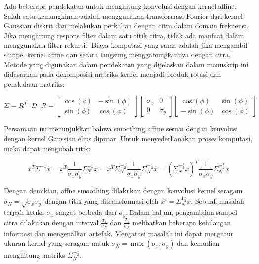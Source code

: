 Ada beberapa pendekatan untuk menghitung konvolusi dengan kernel affine. Salah satu 
kemungkinan adalah menggunakan transformasi Fourier dari kernel Gaussian diskrit 
dan melakukan perkalian dengan citra dalam domain frekuensi. Jika menghitung 
respons filter dalam satu titik citra, tidak ada manfaat dalam menggunakan 
filter rekursif. Biaya komputasi yang sama adalah jika mengambil sampel 
kernel affine dan secara langsung menggabungkannya dengan citra. Metode yang 
digunakan dalam pendekatan yang dijelaskan dalam manuskrip ini didasarkan 
pada dekomposisi matriks kernel menjadi produk rotasi dan penskalaan matriks:


\begin{equation*}
\Sigma = R^{T} \cdot D \cdot R =  
\begin{bmatrix} 
\cos (\phi )&  -\sin (\phi) \\ 
\sin (\phi )& \cos (\phi) 
\end{bmatrix} 
\begin{bmatrix}
\sigma_{x} &0 \\
0 & \sigma_{y}
\end{bmatrix}
\begin{bmatrix}
\cos (\phi )&  \sin (\phi) \\ 
-\sin (\phi )& \cos (\phi)
\end{bmatrix}
\end{equation*}

Persamaan ini menunjukkan bahwa smoothing affine sesuai dengan konvolusi dengan 
kernel Gaussian elips diputar. Untuk menyederhanakan proses komputasi, 
maka dapat mengubah titik:

\begin{equation*}
x^{T}\Sigma^{-1}x = x^{T}\frac{1}{\sigma_{x}\sigma_{y}}\Sigma^{-1}_{N}x=x^{T}\Sigma^{-\frac{1}{2}}_{N}\frac{1}{\sigma_{x}\sigma_{y}}\Sigma^{-\frac{1}{2}}_{N}x=(\Sigma^{-\frac{1}{2}}_{N}x)^{T}\frac{1}{\sigma_{x}\sigma_{y}}\Sigma^{-\frac{1}{2}}_{N}x
\end{equation*}

Dengan demikian, affne smoothing dilakukan dengan konvolusi kernel seragam \(\sigma_{N} = \sqrt{\sigma_{x}\sigma_{y}}\)
dengan titik yang ditransformasi oleh \(x' = \Sigma^{1\frac{1}{2}}_{N}x\). Sebuah masalah terjadi ketika \(\sigma_{x}\) 
sangat berbeda dari \(\sigma_{y}\). Dalam hal ini, pengambilan sampel citra dilakukan dengan interval \(\frac{\sigma_{x}}{\sigma_{N}}\)
dan \(\frac{\sigma_{y}}{\sigma_{N}}\) melibatkan beberapa kehilangan informasi dan mengenalkan artefak. 
Mengatasi masalah ini dapat mengatur ukuran kernel yang seragam untuk \(\sigma_{N} = \max(\sigma_{x},\sigma_{y})\)
dan kemudian menghitung matriks \(\Sigma^{-\frac{1}{2}}_{N}\). 

